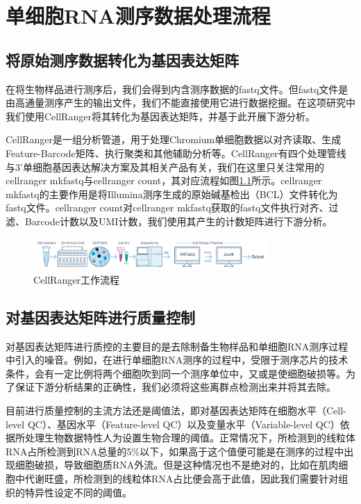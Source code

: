 
\chapter{单细胞RNA测序数据处理流程}

\section{将原始测序数据转化为基因表达矩阵}
  在将生物样品进行测序后，我们会得到内含测序数据的fastq文件。但fastq文件是由高通量测序产生的输出文件，我们不能直接使用它进行数据挖掘。在这项研究中我们使用CellRanger将其转化为基因表达矩阵，并基于此开展下游分析。

  CellRanger是一组分析管道，用于处理Chromium单细胞数据以对齐读取、生成Feature-Barcode矩阵、执行聚类和其他辅助分析等。CellRanger有四个处理管线与3'单细胞基因表达解决方案及其相关产品有关，我们在这里只关注常用的cellranger mkfastq与cellranger count，其对应流程如图\ref{fig:cellranger-workflow}所示。cellranger mkfastq的主要作用是将Illumina测序生成的原始碱基检出（BCL）文件转化为fastq文件。cellranger count对cellranger mkfastq获取的fastq文件执行对齐、过滤、Barcode计数以及UMI计数，我们使用其产生的计数矩阵进行下游分析。

\begin{figure}[!htb]
  \centering
  \includegraphics[width=0.8\textwidth]{figs/cellranger-workflow.png}
  \caption{CellRanger工作流程}
  \label{fig:cellranger-workflow}
\end{figure}

\section{对基因表达矩阵进行质量控制}
  对基因表达矩阵进行质控的主要目的是去除制备生物样品和单细胞RNA测序过程中引入的噪音。例如，在进行单细胞RNA测序的过程中，受限于测序芯片的技术条件，会有一定比例将两个细胞吹到同一个测序单位中，又或是使细胞破损等。为了保证下游分析结果的正确性，我们必须将这些离群点检测出来并将其去除。

  目前进行质量控制的主流方法还是阈值法，即对基因表达矩阵在细胞水平（Cell-level QC）、基因水平（Feature-level QC）以及变量水平（Variable-level QC）依据所处理生物数据特性人为设置生物合理的阈值。正常情况下，所检测到的线粒体RNA占所检测到RNA总量的5\%以下，如果高于这个值便可能是在测序的过程中出现细胞破损，导致细胞质RNA外流。但是这种情况也不是绝对的，比如在肌肉细胞中代谢旺盛，所检测到的线粒体RNA占比便会高于此值，因此我们需要针对组织的特异性设定不同的阈值。

